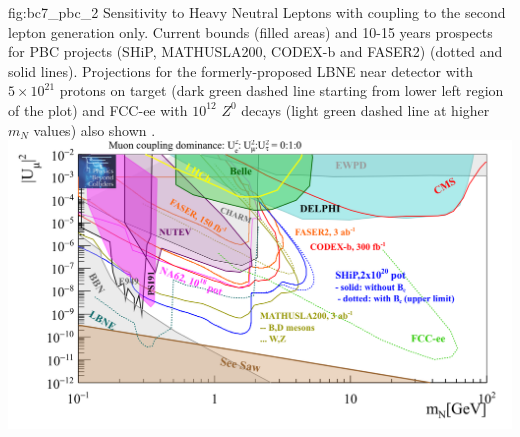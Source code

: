 \begin{dunefigure}{fig:bc7_pbc_2}
    {Sensitivity to Heavy Neutral Leptons with coupling to the second lepton generation only.
    Current bounds (filled areas) and 10-15 years prospects for PBC projects (SHiP, MATHUSLA200, CODEX-b and FASER2) (dotted and solid lines).
    Projections for the formerly-proposed LBNE near detector with $5 \times 10^{21}$ protons on target (dark green dashed line starting 
    from lower left region of the plot) and FCC-ee with $10^{12}$ $Z^0$
    decays (light green dashed line at higher $m_N$ values) also shown .}
  \includegraphics[width=0.8\linewidth]{graphics/HNL_bc7_pbc_2.png}
\end{dunefigure}



